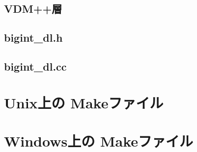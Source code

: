 \documentclass[\pformat,12pt]{jarticle}
\begin{document}
\subsection{VDM++層}



\subsection{bigint\_dl.h}



\subsection{bigint\_dl.cc}



\newpage
\section{Unix上の Makeファイル}\label{app:unixmake}


\newpage
\section{Windows上の Makeファイル}\label{app:winmake}

\end{document}
